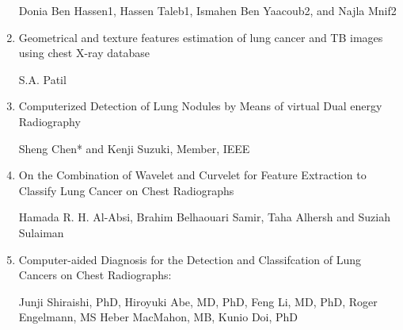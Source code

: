 \documentclass[hidelinks,12pt]{article}
\begin{document}
\begin{enumerate}
Donia Ben Hassen1, Hassen Taleb1, Ismahen Ben Yaacoub2, and Najla Mnif2


\item Geometrical and texture features estimation of lung cancer and TB images using chest X-ray database \label{11}

S.A. Patil

\item Computerized Detection of Lung Nodules by Means of virtual Dual energy Radiography \label{12}

Sheng Chen* and Kenji Suzuki, Member, IEEE 

\item On the Combination of Wavelet and Curvelet for Feature Extraction to Classify Lung Cancer on Chest Radiographs \label{13}

Hamada R. H. Al-Absi, Brahim Belhaouari Samir, Taha Alhersh and Suziah Sulaiman

\item Computer-aided Diagnosis for the Detection and Classifcation of Lung Cancers on Chest Radiographs:

Junji Shiraishi, PhD, Hiroyuki Abe, MD, PhD, Feng Li, MD, PhD, Roger Engelmann, MS
Heber MacMahon, MB, Kunio Doi, PhD

\end{enumerate}

\tableofcontents
\end{document}
